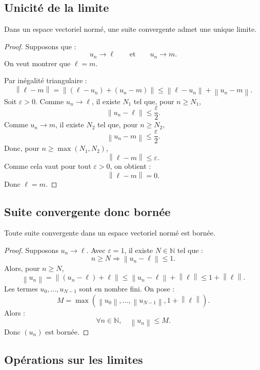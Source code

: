 \documentclass[11pt,a4paper]{article}
\newcommand{\N}{\mathbb N}
\newcommand{\norme}[1]{\left\lVert #1 \right\rVert}
\begin{document}
\subsection{Unicité de la limite}

\begin{theorembox}
Dans un espace vectoriel normé, une suite convergente admet une unique limite.
\end{theorembox}

\begin{proof}
Supposons que :
\[
u_n\to \ell
\qquad\text{et}\qquad
u_n\to m.
\]
On veut montrer que \(\ell=m\).

Par inégalité triangulaire :
\[
\norme{\ell-m}
=\norme{(\ell-u_n)+(u_n-m)}
\leq \norme{\ell-u_n}+\norme{u_n-m}.
\]
Soit \(\varepsilon>0\). Comme \(u_n\to \ell\), il existe \(N_1\) tel que, pour \(n\geq N_1\),
\[
\norme{u_n-\ell}\leq \frac{\varepsilon}{2}.
\]
Comme \(u_n\to m\), il existe \(N_2\) tel que, pour \(n\geq N_2\),
\[
\norme{u_n-m}\leq \frac{\varepsilon}{2}.
\]
Donc, pour \(n\geq \max(N_1,N_2)\),
\[
\norme{\ell-m}\leq \varepsilon.
\]
Comme cela vaut pour tout \(\varepsilon>0\), on obtient :
\[
\norme{\ell-m}=0.
\]
Donc \(\ell=m\).
\end{proof}

\subsection{Suite convergente donc bornée}

\begin{theorembox}
Toute suite convergente dans un espace vectoriel normé est bornée.
\end{theorembox}

\begin{proof}
Supposons \(u_n\to \ell\).  
Avec \(\varepsilon=1\), il existe \(N\in\N\) tel que :
\[
n\geq N\Rightarrow \norme{u_n-\ell}\leq 1.
\]
Alors, pour \(n\geq N\),
\[
\norme{u_n}
=\norme{(u_n-\ell)+\ell}
\leq \norme{u_n-\ell}+\norme{\ell}
\leq 1+\norme{\ell}.
\]
Les termes \(u_0,\dots,u_{N-1}\) sont en nombre fini. On pose :
\[
M=\max\left(\norme{u_0},\dots,\norme{u_{N-1}},1+\norme{\ell}\right).
\]
Alors :
\[
\forall n\in\N,\quad \norme{u_n}\leq M.
\]
Donc \((u_n)\) est bornée.
\end{proof}

\subsection{Opérations sur les limites}
\end{document}
